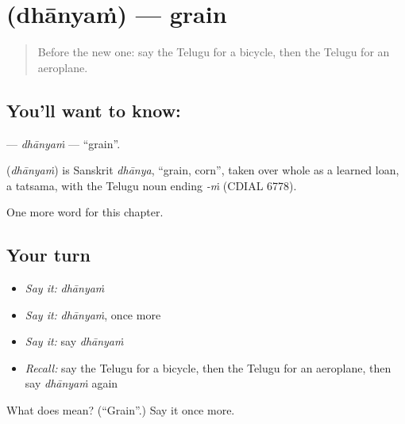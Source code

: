 \section[\texorpdfstring{\te{ధాన్యం} (dhānyaṁ)}{ధాన్యం (dhānyaṁ)}]{ (dhānyaṁ) — grain}

\label{lesson:TE-C134-dhanyam}



\begin{quote}
Before the new one: say the Telugu for a bicycle, then the Telugu for an aeroplane.
\end{quote}

\subsection*{You'll want to know: }
\textbf{} — \emph{dhānyaṁ} — \textquotedblleft{}grain\textquotedblright{}.

\begin{cousinweb}
\textbf{} (\emph{dhānyaṁ}) is Sanskrit \emph{dhānya}, \textquotedblleft{}grain, corn\textquotedblright{}, taken over whole as a learned loan, a tatsama, with the Telugu noun ending \emph{-ṁ} (CDIAL 6778).
\end{cousinweb}

\begin{grammarlens}[title={What you've built}]
One more word for this chapter.
\end{grammarlens}

\subsection*{Your turn}
\begin{itemize}
\raggedright
  \item \emph{Say it:} \emph{dhānyaṁ}
  \item \emph{Say it:} \emph{dhānyaṁ}, once more
  \item \emph{Say it:} say \emph{dhānyaṁ}
  \item \emph{Recall:} say the Telugu for a bicycle, then the Telugu for an aeroplane, then say \emph{dhānyaṁ} again
\end{itemize}

\begin{tcolorbox}[breakable,colback=teal!4,colframe=teal!35!black,title={Before you move on}]
What does  mean? (\textquotedblleft{}Grain\textquotedblright{}.) Say it once more.
\end{tcolorbox}
